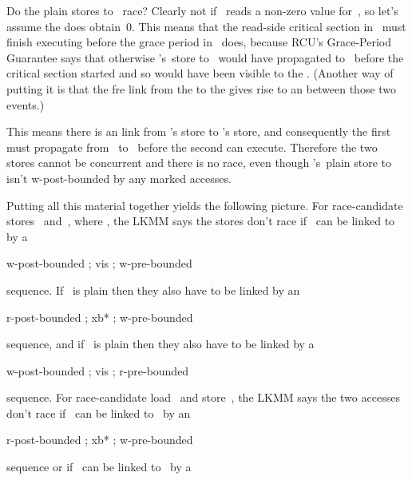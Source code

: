 Do the plain stores to~ race?  Clearly not if ~reads a non-zero
value for~, so let's assume the  does obtain~0.
This
means that the read-side critical section in~ must finish executing
before the grace period in~ does, because RCU's Grace-Period
Guarantee says that otherwise 's~store to~ would have
propagated to~%
 before the critical section started and so would have been visible
to the .
(Another way of putting it is that the fre link
from the  to the  gives rise to an
between those two events.)

This means there is an  link from 's  store
to 's  store, and consequently the first must propagate
from~ to~
before the second can execute.
Therefore the two stores cannot be
concurrent and there is no race, even though 's~plain store to~
isn't w-post-bounded by any marked accesses.

Putting all this material together yields the following picture.
For
race-candidate stores~ and~, where ,
the LKMM says the
stores don't race if ~can be linked to~ by a

\begin{VerbatimU}
	w-post-bounded ; vis ; w-pre-bounded
\end{VerbatimU}

\noindent%
sequence.
If ~is plain then they also have to be linked by an

\begin{VerbatimU}
	r-post-bounded ; xb* ; w-pre-bounded
\end{VerbatimU}

\noindent%
sequence, and if ~is plain then they also have to be linked by a

\begin{VerbatimU}
	w-post-bounded ; vis ; r-pre-bounded
\end{VerbatimU}

\noindent%
sequence.
For race-candidate load~ and store~, the LKMM says the
two accesses don't race if ~can be linked to~ by an

\begin{VerbatimU}
	r-post-bounded ; xb* ; w-pre-bounded
\end{VerbatimU}

\noindent%
sequence or if ~can be linked to~ by a


